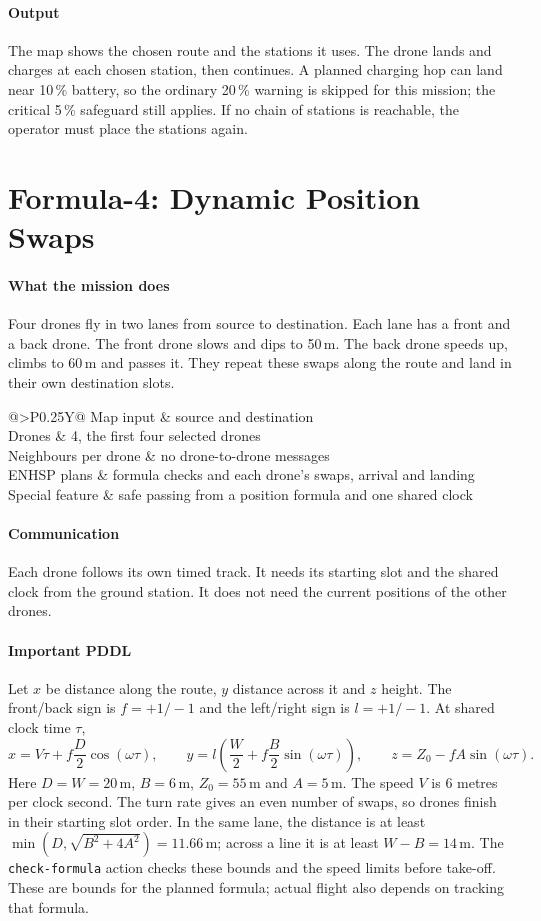 \documentclass[11pt,a4paper,oneside]{report}
\makeatletter
\newcommand{\code}[1]{\texttt{#1}}
\newcommand{\glancebox}[2]{%
  \begin{tcolorbox}[enhanced,colback=softblue!45,colframe=navy,coltitle=white,
      fonttitle=\bfseries\small,title={#1},boxrule=0.6pt,arc=2pt,
      left=6pt,right=6pt,top=3pt,bottom=3pt,before skip=8pt,after skip=10pt]
    \small\setstretch{1.1}%
    \begin{tabularx}{\linewidth}{@{}>{\bfseries}P{0.25\linewidth}Y@{}}#2\end{tabularx}
  \end{tcolorbox}}
\makeatother
\begin{document}
\paragraph{Output}
The map shows the chosen route and the stations it uses. The drone lands and charges at each
chosen station, then continues. A planned charging hop can land near 10\,\% battery, so the
ordinary 20\,\% warning is skipped for this mission; the critical 5\,\% safeguard still applies.
If no chain of stations is reachable, the operator must place the stations again.

\section{Formula-4: Dynamic Position Swaps}\label{sec:plan-formula4}
\paragraph{What the mission does}
Four drones fly in two lanes from source to destination. Each lane has a front and a back drone.
The front drone slows and dips to 50\,m. The back drone speeds up, climbs to 60\,m and passes it.
They repeat these swaps along the route and land in their own destination slots.

\glancebox{At a glance: Formula-4}{
Map input & source and destination \\
Drones & 4, the first four selected drones \\
Neighbours per drone & no drone-to-drone messages \\
ENHSP plans & formula checks and each drone's swaps, arrival and landing \\
Special feature & safe passing from a position formula and one shared clock \\}

\paragraph{Communication}
Each drone follows its own timed track. It needs its starting slot and the shared clock from
the ground station. It does not need the current positions of the other drones.

\paragraph{Important PDDL}
Let $x$ be distance along the route, $y$ distance across it and $z$ height. The front/back sign
is $f=+1/-1$ and the left/right sign is $l=+1/-1$. At shared clock time $\tau$,
\[
 x=V\tau+f\frac D2\cos(\omega\tau),\qquad
 y=l\left(\frac W2+f\frac B2\sin(\omega\tau)\right),\qquad
 z=Z_0-fA\sin(\omega\tau).
\]
Here $D=W=20$\,m, $B=6$\,m, $Z_0=55$\,m and $A=5$\,m. The speed $V$ is 6 metres per clock
second. The turn rate gives an even number of swaps, so drones finish in their starting slot
order. In the same lane, the distance is at least
$\min(D,\sqrt{B^2+4A^2})=11.66$\,m; across a line it is at least $W-B=14$\,m.
The \code{check-formula} action checks these bounds and the speed limits before take-off.
These are bounds for the planned formula; actual flight also depends on tracking that formula.
\end{document}
